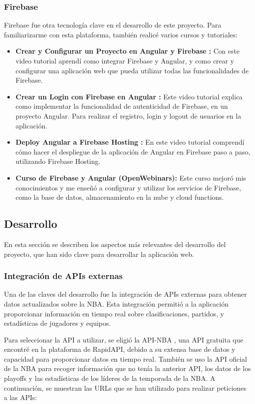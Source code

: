 \subsubsection{Firebase}
Firebase fue otra tecnología clave en el desarrollo de este proyecto. Para familiarizarme con esta plataforma, también realicé varios cursos y tutoriales:
\begin{itemize}
\tightlist
    \item 
        \textbf{Crear y Configurar un Proyecto en Angular y Firebase \cite{tutorial-firebase}:} Con este video tutorial aprendí como integrar Firebase y Angular, y como crear y configurar una aplicación web que pueda utilizar todas las funcionalidades de Firebase.
    \item 
        \textbf{Crear un Login con Firebase en Angular \cite{tutorial-firebase-2}:} Este video tutorial explica como implementar la funcionalidad de autenticidad de Firebase, en un proyecto Angular. Para realizar el registro, login y logout de usuarios en la aplicación.
    \item 
        \textbf{Deploy Angular a Firebase Hosting \cite{tutorial-firebase-3}:} En este video tutorial comprendí cómo hacer el despliegue de la aplicación de Angular en Firebase paso a paso, utilizando Firebase Hosting.
    \item
         \textbf{Curso de Firebase y Angular (OpenWebinars):} Este curso mejoró mis conocimientos y me enseñó a configurar y utilizar los servicios de Firebase, como la base de datos, almacenamiento en la nube y cloud functions.
\end{itemize}


\subsection{Desarrollo}
En esta sección se describen los aspectos más relevantes del desarrollo del proyecto, que han sido clave para desarrollar la aplicación web.

\subsubsection{Integración de APIs externas}
Una de las claves del desarrollo fue la integración de APIs externas para obtener datos actualizados sobre la NBA. Esta integración permitió a la aplicación proporcionar información en tiempo real sobre clasificaciones, partidos, y estadísticas de jugadores y equipos.

Para seleccionar la API a utilizar, se eligió la API-NBA \cite{api-nba}, una API gratuita que encontré en la plataforma de RapidAPI, debido a su extensa base de datos y capacidad para proporcionar datos en tiempo real.
También se uso la API oficial de la NBA para recoger información que no tenía la anterior API, los datos de los playoffs y las estadísticas de los líderes de la temporada de la NBA. A continuación, se muestran las URLs que se han utilizado para realizar peticiones a las APIs:


